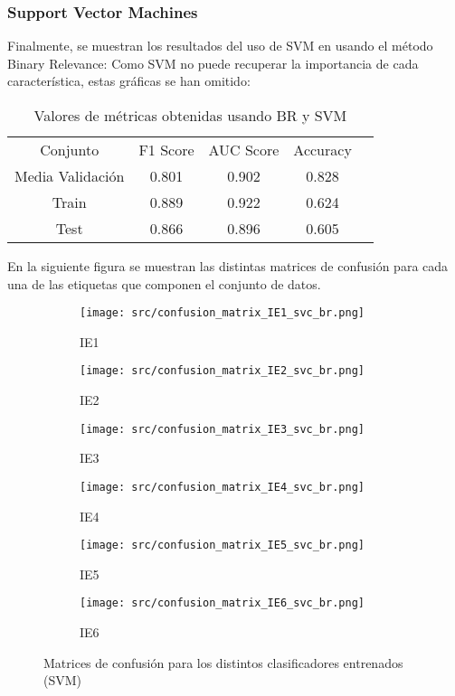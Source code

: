 \subsubsection*{Support Vector Machines}
Finalmente, se muestran los resultados del uso de SVM en usando el método Binary Relevance:
Como SVM no puede recuperar la importancia de cada característica, estas gráficas se han omitido:
\begin{table}[H]
	\centering
	\begin{tabular}{|c|c|c|c|c}
		\cline{1-4}
		Conjunto         & F1 Score & AUC Score & Accuracy \\ \cline{1-4}
		Media Validación & 0.801    & 0.902     & 0.828    \\ \cline{1-4}
		Train            & 0.889    & 0.922     & 0.624    \\ \cline{1-4}
		Test             & 0.866    & 0.896     & 0.605    \\ \cline{1-4}
	\end{tabular}
	\caption{Valores de métricas obtenidas usando BR y SVM}
\end{table}
En la siguiente figura se muestran las distintas matrices de confusión para cada una de las etiquetas que componen el conjunto de datos.\linebreak
\begin{figure}[H]
	\centering
	\begin{subfigure}[b]{0.3\textwidth}
		\centering
		\texttt{[image: src/confusion\_matrix\_IE1\_svc\_br.png]}
		\caption{IE1}
	\end{subfigure}
	\hfill
	\begin{subfigure}[b]{0.3\textwidth}
		\centering
		\texttt{[image: src/confusion\_matrix\_IE2\_svc\_br.png]}
		\caption{IE2}
	\end{subfigure}
	\hfill
	\begin{subfigure}[b]{0.3\textwidth}
		\centering
		\texttt{[image: src/confusion\_matrix\_IE3\_svc\_br.png]}
		\caption{IE3}
	\end{subfigure}
	\hfill
	\begin{subfigure}[b]{0.3\textwidth}
		\centering
		\texttt{[image: src/confusion\_matrix\_IE4\_svc\_br.png]}
		\caption{IE4}
	\end{subfigure}
	\hfill
	\begin{subfigure}[b]{0.3\textwidth}
		\centering
		\texttt{[image: src/confusion\_matrix\_IE5\_svc\_br.png]}
		\caption{IE5}
	\end{subfigure}
	\hfill
	\begin{subfigure}[b]{0.3\textwidth}
		\centering
		\texttt{[image: src/confusion\_matrix\_IE6\_svc\_br.png]}
		\caption{IE6}
	\end{subfigure}
	\caption{Matrices de confusión para los distintos clasificadores entrenados (SVM)}
	\label{fig:ml_conf_matrix_svc}
\end{figure}
